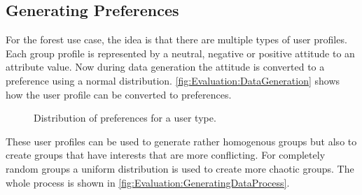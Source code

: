 
\subsection{Generating Preferences}

For the forest use case, the idea is that there are multiple types of user profiles. Each group profile is represented by a neutral, negative or positive attitude to an attribute value. Now during data generation the attitude is converted to a preference using a normal distribution. \autoref{fig:Evaluation:DataGeneration} shows how the user profile can be converted to preferences.

\pgfplotsset{height=5cm,width=\textwidth,compat=1.8}
\begin{figure}
 \caption{Distribution of preferences for a user type.}
\label{fig:Evaluation:DataGeneration}
\end{figure}

These user profiles can be used to generate rather homogenous groups but also to create groups that have interests that are more conflicting. For completely random groups a uniform distribution is used to create more chaotic groups. The whole process is shown in \autoref{fig:Evaluation:GeneratingDataProcess}.



